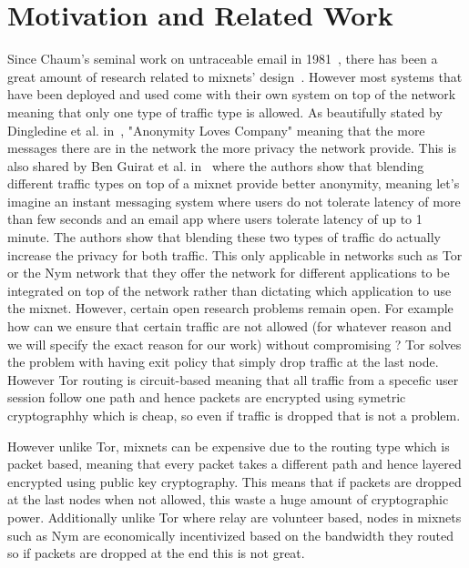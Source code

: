 \section{Motivation and Related Work}
\label{sec:related}

Since Chaum’s seminal work on untraceable email in 1981~\cite{chaum-mix}, there has been a great amount of research related to mixnets' design~\cite{piotrowska2017loopix, van2015vuvuzela, kwon2020xrd, lazar2018karaoke, cottrell1995mixmaster, alexopoulos2017MCMIX, chaum2016cmix, chaum-mix, danezis2003mixminion}. However most systems that have been deployed and used come with their own system on top of the network meaning that only one type of traffic type is allowed. As beautifully stated by Dingledine et al. in~\cite{dingledine2006anonymity}, "Anonymity Loves Company" meaning that the more messages there are in the network the more privacy the network provide. This is also shared by Ben Guirat et al. in~\cite{benguirat2023blending} where the authors show that blending different traffic types on top of a mixnet provide better anonymity, meaning let's imagine an instant messaging system where users do not tolerate latency of more than few seconds and an email app where users tolerate latency of up to 1 minute. The authors show that blending these two types of traffic do actually increase the privacy for both traffic. This only applicable in networks such as Tor or the Nym network that they offer the network for different applications to be integrated on top of the network rather than dictating which application to use the mixnet.
However, certain open research problems remain open. For example how can we ensure that certain traffic are not allowed (for whatever reason and we will specify the exact reason for our work) without compromising ?
Tor solves the problem with having exit policy that simply drop traffic at the last node. However Tor routing is circuit-based meaning that all traffic from a specefic user session follow one path and hence packets are encrypted using symetric cryptographhy which is cheap, so even if traffic is dropped that is not a problem.

However unlike Tor, mixnets can be expensive due to the routing type which
is packet based, meaning that every packet takes a different path and
hence layered encrypted using public key cryptography. This means that if
packets are dropped at the last nodes when not allowed, this waste a huge
amount of cryptographic power. Additionally unlike Tor where relay are
volunteer based, nodes in mixnets such as Nym are economically incentivized
based on the bandwidth they routed so if packets are dropped at the end
this is not great.
%
